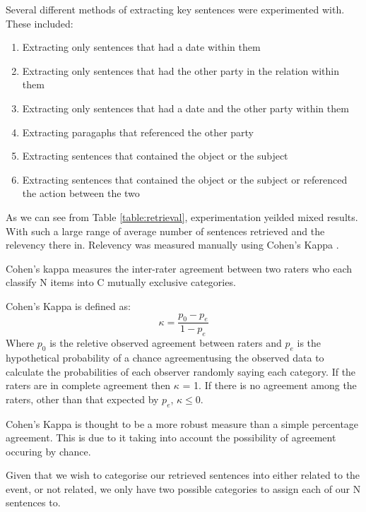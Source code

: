 \documentclass[bsc,frontabs,twoside,singlespacing,parskip,deptreport]{infthesis}     %
\begin{document}
Several different methods of extracting key sentences were experimented with.
These included:
\begin{enumerate}
  \item Extracting only sentences that had a date within them
  \item Extracting only sentences that had the other party in the relation within them
  \item Extracting only sentences that had a date and the other party within them
  \item Extracting paragaphs that referenced the other party
  \item Extracting sentences that contained the object or the subject 
  \item Extracting sentences that contained the object or the subject or referenced the action between the two 
\end{enumerate}


As we can see from Table \ref{table:retrieval}, experimentation yeilded mixed results.
With such a large range of average number of sentences retrieved and the relevency there in.
Relevency was measured manually using Cohen's Kappa \cite{wood2007understanding}.

Cohen's kappa measures the inter-rater agreement between two raters
who each classify N items into C mutually exclusive categories.

Cohen's Kappa is defined as:\\
\begin{equation}
  \kappa = \frac{p_{0} - p_{e}}{1 - p_{e}}\nonumber
\end{equation}
Where $p_0$ is the reletive observed agreement between raters and $p_e$ is the hypothetical probability
of a chance agreementusing the observed data to calculate the probabilities of each observer randomly saying each category.
If the raters are in complete agreement then $\kappa$ = 1.
If there is no agreement among the raters, other than that expected by $p_e$, $\kappa \leq 0$.

Cohen's Kappa is thought to be a more robust measure than a simple percentage agreement.
This is due to it taking into account the possibility of agreement occuring by chance.


Given that we wish to categorise our retrieved sentences into either related to the event, or not related,
we only have two possible categories to assign each of our N sentences to.
\end{document}
